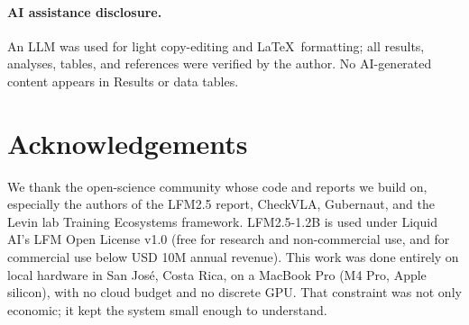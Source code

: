 \documentclass[11pt,a4paper]{article}
\begin{document}
\paragraph{AI assistance disclosure.} An LLM was used for light copy-editing and \LaTeX\ formatting; all results, analyses, tables, and references were verified by the author. No AI-generated content appears in Results or data tables.

\section{Acknowledgements}

We thank the open-science community whose code and reports we build on, especially the authors of the LFM2.5 report, CheckVLA, Gubernaut, and the Levin lab Training Ecosystems framework. LFM2.5-1.2B is used under Liquid AI's LFM Open License v1.0 (free for research and non-commercial use, and for commercial use below USD 10M annual revenue). This work was done entirely on local hardware in San Jos\'e, Costa Rica, on a MacBook Pro (M4 Pro, Apple silicon), with no cloud budget and no discrete GPU. That constraint was not only economic; it kept the system small enough to understand.
\end{document}
